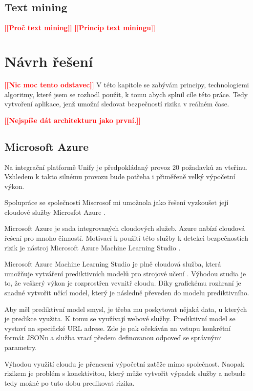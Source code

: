 \documentclass[thesis=M,czech]{FITthesis}[2012/10/20]
\newcommand{\todo}[1]{\textcolor{red}{\textbf{[[#1]]}}}
\newcommand{\blind}[1][1]{\textcolor{gray}{\Blindtext[#1][1]}}
\begin{document}
	\section{Text mining}
		\todo{Proč text mining}
		\todo{Princip text miningu}
		\blind[2]

\chapter{Návrh řešení}
	\todo{Nic moc tento odstavec}
	V této kapitole se zabývám principy, technologiemi algoritmy, které jsem se rozhodl použít, k tomu abych splnil cíle této práce. Tedy vytvoření aplikace, jenž umožní sledovat bezpečností rizika v reálném čase.
	
	\todo{Nejspíše dát architekturu jako první.}
	
	\section{Microsoft Azure}
		\label{sec:ms_azure}
		Na integrační platformě Unify \cite{unify} je předpokládaný provoz 20 požadavků za vteřinu. Vzhledem k takto silnému provozu bude potřeba i přiměřeně velký výpočetní výkon. 
			
		Spolupráce se společností Miscrosof \cite{microsoft} mi umožnola jako řešení vyzkoušet její cloudové služby Microsfot Azure \cite{msAzure}.
			
		Microsoft Azure je sada integrovaných cloudových služeb. Azure nabízí cloudová řešení pro mnoho činností. Motivací k použití této služby k detekci bezpečnostích rizik je nástroj Microsoft Azure Machine Learning Studio \cite{msAzureStudio}.
			
		Microsoft Azure Machine Learning Studio je plně cloudová služba, která umožňuje vytváření prediktivních modelů pro strojové učení \cite{msAzureStudio}. Výhodou studia je to, že veškerý výkon je rozprostřen vevnitř cloudu. Díky grafickému rozhraní je snadné vytvořit učící model, který je následně převeden do modelu prediktivního.
			
		Aby měl prediktivní model smysl, je třeba mu poskytovat nějaká data, u kterých je predikce využita. K tomu se využívají webové služby.
		Prediktivní model se vystaví na specifické URL adrese. Zde je pak očekáván na vstupu konkrétní formát JSONu a služba vrací předem definovanou odpoveď se správnými parametry.
		
		Výhodou využití cloudu je přenesení výpočetní zatěže mimo společnost. Naopak rizikem je problém s konektivitou, který může vytvořit výpadek služby a nebude tedy možné po tuto dobu predikovat rizika.
		
\end{document}
